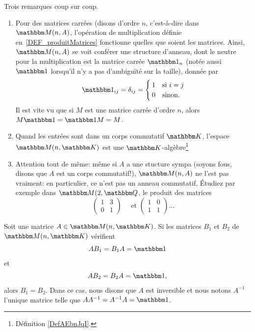 \begin{remark}
  Trois remarques coup sur coup.
  \begin{enumerate}
  \item
    Pour des matrices carrées (disons d'ordre \( n \), c'est-à-dire dans \( \eM(n,A)\), l'opération de multiplication définie en~\ref{DEF_produitMatrices} fonctionne quelles que soient les matrices. Ainsi, \( \eM(n, A)\) se voit conférer une structure d'anneau, dont le neutre pour la multiplication est la matrice carrée \( \mtu_n\) (notée aussi \( \mtu\) lorsqu'il n'y a pas d'ambiguïté sur la taille), donnée par
\begin{equation}
    \mtu_{ij}=\delta_{ij} = \begin{cases}
        1    &   \text{si } i=j\\
        0    &    \text{sinon.}
    \end{cases}
\end{equation}
Il est vite vu que si \( M\) est une matrice carrée d'ordre \( n \), alors \( M\mtu=\mtu M=M\).

  \item
    Quand les entrées sont dans un corps commutatif \( \eK \), l'espace \( \eM(n,\eK)\) est une \( \eK\)-algèbre\footnote{Définition \ref{DefAEbnJqI}.}
  \item
    Attention tout de même: même si \( A \) a une stucture sympa (soyons fous, disons que \( A \) est un corps commutatif!), \( \eM(n,A)\) ne l'est pas vraiment: en particulier, ce n'est pas un anneau commutatif. Étudiez par exemple dans \( \eM(2, \eQ \), le produit des matrices
    \begin{equation}
    \begin{pmatrix}
         1   &   3   \\
         0   &   1
     \end{pmatrix}\quad\text{ et }
     \begin{pmatrix}
         1   &   0    \\
         1   &   1
     \end{pmatrix} \dots
     \end{equation}
   \end{enumerate}
\end{remark}

\begin{propositionDef}      \label{PROPooMLWRooRWfZXE}
    Soit une matrice \( A\in \eM(n,\eK)\). Si les matrices \( B_1\) et \( B_2\) de \( \eM(n,\eK)\) vérifient
    \begin{equation}
        AB_1=B_1A=\mtu
    \end{equation}
    et
    \begin{equation}
        AB_2=B_2A=\mtu,
    \end{equation}
    alors \( B_1=B_2\). Dans ce cas, nous disons que \( A\) est inversible et nous notons \( A^{-1}\) l'unique matrice telle que \( AA^{-1}=A^{-1}A=\mtu\).
\end{propositionDef}


